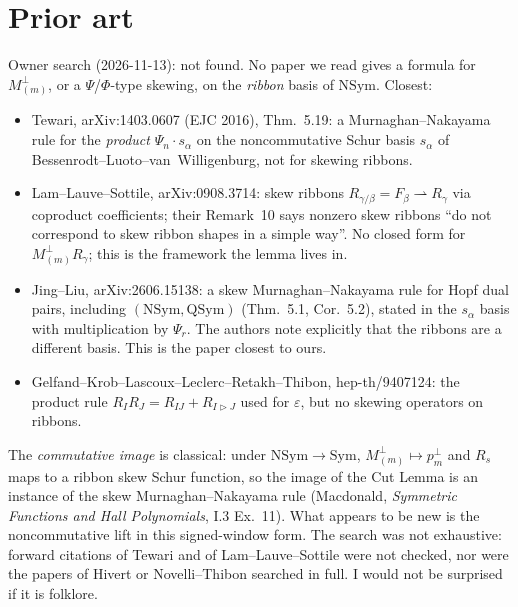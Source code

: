 \documentclass[11pt]{amsart}
\newcommand{\gr}[1]{\textsf{#1}}
\newcommand{\QSym}{\mathrm{QSym}}
\newcommand{\NSym}{\mathrm{NSym}}
\newcommand{\Sym}{\mathrm{Sym}}
\newcommand{\te}{\varepsilon}
\theoremstyle{plain}
\theoremstyle{definition}
\begin{document}
\section{Prior art}\label{sec:prior}
Owner search (2026-11-13): \gr{not found}. No paper we read gives a formula for $M_{(m)}^\perp$, or a $\Psi$/$\Phi$-type skewing, on the \emph{ribbon} basis of $\NSym$. Closest:
\begin{itemize}[leftmargin=1.2em,itemsep=1pt]
\item Tewari, arXiv:1403.0607 (EJC 2016), Thm.~5.19: a Murnaghan--Nakayama rule for the \emph{product} $\Psi_n\cdot s_\alpha$ on the noncommutative Schur basis $s_\alpha$ of Bessenrodt--Luoto--van~Willigenburg, not for skewing ribbons.
\item Lam--Lauve--Sottile, arXiv:0908.3714: skew ribbons $R_{\gamma/\beta}=F_\beta\rightharpoonup R_\gamma$ via coproduct coefficients; their Remark~10 says nonzero skew ribbons ``do not correspond to skew ribbon shapes in a simple way''. No closed form for $M_{(m)}^\perp R_\gamma$; this is the framework the lemma lives in.
\item Jing--Liu, arXiv:2606.15138: a skew Murnaghan--Nakayama rule for Hopf dual pairs, including $(\NSym,\QSym)$ (Thm.~5.1, Cor.~5.2), stated in the $s_\alpha$ basis with multiplication by $\Psi_r$. The authors note explicitly that the ribbons are a different basis. This is the paper closest to ours.
\item Gelfand--Krob--Lascoux--Leclerc--Retakh--Thibon, hep-th/9407124: the product rule $R_IR_J=R_{IJ}+R_{I\triangleright J}$ used for $\te$, but no skewing operators on ribbons.
\end{itemize}
The \emph{commutative image} is classical: under $\NSym\to\Sym$, $M_{(m)}^\perp\mapsto p_m^\perp$ and $R_s$ maps to a ribbon skew Schur function, so the image of the Cut Lemma is an instance of the skew Murnaghan--Nakayama rule (Macdonald, \emph{Symmetric Functions and Hall Polynomials}, I.3 Ex.~11). What appears to be new is the noncommutative lift in this signed-window form. The search was not exhaustive: forward citations of Tewari and of Lam--Lauve--Sottile were not checked, nor were the papers of Hivert or Novelli--Thibon searched in full. I would not be surprised if it is folklore.
\end{document}
